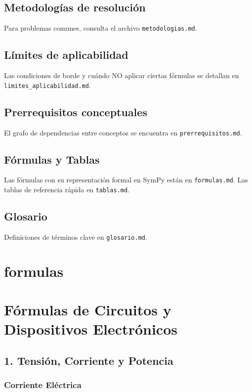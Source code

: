 \documentclass[11pt,a4paper]{article}
\begin{document}
\subsection*{Metodologías de resolución}


Para problemas comunes, consulta el archivo \texttt{metodologias.md}.


\subsection*{Límites de aplicabilidad}


Las condiciones de borde y cuándo NO aplicar ciertas fórmulas se detallan en \texttt{limites\_aplicabilidad.md}.


\subsection*{Prerrequisitos conceptuales}


El grafo de dependencias entre conceptos se encuentra en \texttt{prerrequisitos.md}.


\subsection*{Fórmulas y Tablas}


Las fórmulas con su representación formal en SymPy están en \texttt{formulas.md}. Las tablas de referencia rápida en \texttt{tablas.md}.


\subsection*{Glosario}


Definiciones de términos clave en \texttt{glosario.md}.


\section*{formulas}

\section*{Fórmulas de Circuitos y Dispositivos Electrónicos}


\subsection*{1. Tensión, Corriente y Potencia}


\subsubsection*{Corriente Eléctrica}
\end{document}
